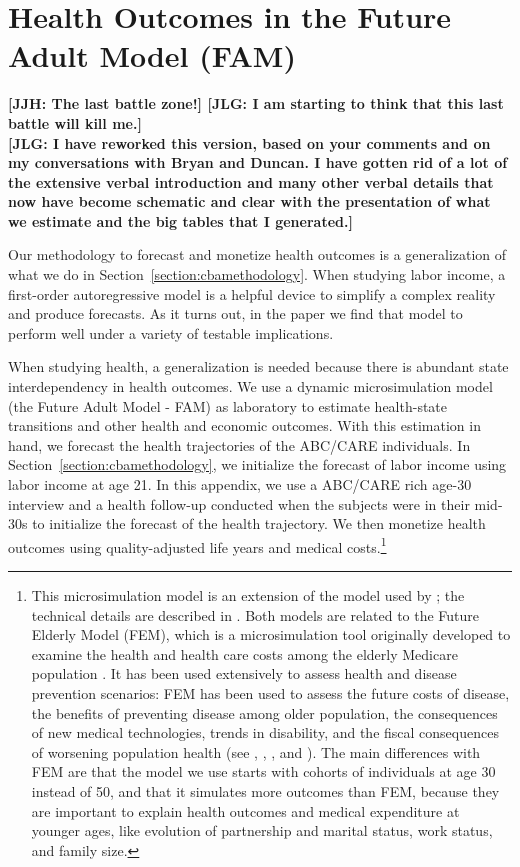 \section{Health Outcomes in the Future Adult Model (FAM)} \label{appendix:health}

\noindent \textbf{[JJH: The last battle zone!] [JLG: I am starting to think that this last battle will kill me.]}\\

\noindent \textbf{[JLG: I have reworked this version, based on your comments and on my conversations with Bryan and Duncan. I have gotten rid of a lot of the extensive verbal introduction and many other verbal details that now have become schematic and clear with the presentation of what we estimate and the big tables that I generated.]}

Our methodology to forecast and monetize health outcomes is a generalization of what we do in Section~\ref{section:cbamethodology}. When studying labor income, a first-order autoregressive model is a helpful device to simplify a complex reality and produce forecasts. As it turns out, in the paper we find that model to perform well under a variety of testable implications. 

When studying health, a generalization is needed because there is abundant state interdependency in health outcomes. We use a dynamic microsimulation model (the Future Adult Model - FAM) as laboratory to estimate health-state transitions and other health and economic outcomes. With this estimation in hand, we forecast the health trajectories of the ABC/CARE individuals. In Section~\ref{section:cbamethodology}, we initialize the forecast of labor income using labor income at age 21. In this appendix, we use a ABC/CARE rich age-30 interview and a health follow-up conducted when the subjects were in their mid-30s to initialize the forecast of the health trajectory. We then monetize health outcomes using quality-adjusted life years and medical costs.\footnote{This microsimulation model is an extension of the model used by \citet{Prados_etal_2015_How-Much-Can-Education}; the technical details are described in \citet{Goldman_etal_2015_Future-Adult-Model}. Both models are related to the Future Elderly Model (FEM), which is a microsimulation tool originally developed to examine the health and health care costs among the elderly Medicare population \citep{Goldman_etal_2004_RAND-Report_Health-Status-Elderly}. It has been used extensively to assess health and disease prevention scenarios: FEM has been used to assess the future costs of disease, the benefits of preventing disease among older population, the consequences of new medical technologies, trends in disability, and the fiscal consequences of worsening population health (see \citet{Goldman_etal_2004_RAND-Report_Health-Status-Elderly}, \citet{Lakdawalla_etal_2004_Health-and-Cost}, \citet{Goldman_etal_2005_HA}, and \citet{Zissimopoulos_etal_2014_Delaying-Alzheimers}). The main differences with FEM are that the model we use starts with cohorts of individuals at age 30 instead of 50, and that it simulates more outcomes than FEM, because they are important to explain health outcomes and medical expenditure at younger ages, like evolution of partnership and marital status, work status, and family size.}

